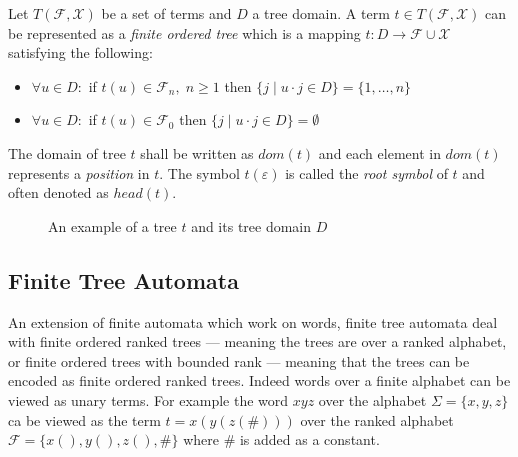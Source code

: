 \begin{defn}
Let $T(\mathcal{F}, \mathcal{X})$ be a set of terms and $D$ a tree domain. A term $t \in T(\mathcal{F}, \mathcal{X})$ can be represented as a \emph{finite ordered tree} which is a mapping $t: D \rightarrow \mathcal{F} \cup \mathcal{X}$ satisfying the following:
\begin{itemize}
    \item $\forall u \in D:$ if $t(u) \in \mathcal{F}_n, \; n \geq 1$ then $\{j \; | \; u \cdot j \in D\} = \{1, \dots, n\}$
    \item $\forall u \in D:$ if $t(u) \in \mathcal{F}_0$ then $\{j \; | \; u \cdot j \in D\} = \emptyset$
\end{itemize}
The domain of tree $t$ shall be written as $dom(t)$ and each element in $dom(t)$ represents a \emph{position} in $t$. The symbol $t(\varepsilon)$ is called the \emph{root symbol} of $t$ and often denoted as $head(t)$.
\end{defn}

\begin{figure}[H]
    \centering
    \caption{An example of a tree $t$ and its tree domain $D$}
    \label{fig_absintr_intervals}
\end{figure}

\subsection{Finite Tree Automata}
An extension of finite automata which work on words, finite tree automata deal with finite ordered ranked trees --- meaning the trees are over a ranked alphabet, or finite ordered trees with bounded rank --- meaning that the trees can be encoded as finite ordered ranked trees. Indeed words over a finite alphabet can be viewed as unary terms. For example the word $xyz$ over the alphabet $\Sigma = \{x,y,z\}$ ca be viewed as the term $t = x(y(z(\#)))$ over the ranked alphabet $\mathcal{F} = \{x(), y(), z(), \#\}$ where $\#$ is added as a constant.


